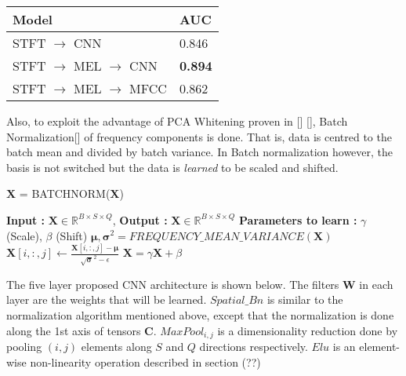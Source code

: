     \begin{tabular}{ | p{5cm} | l |}
    \hline
    \textbf{Model} & \textbf{AUC} \\ \hline
    STFT $\rightarrow$ CNN &  0.846\\ \hline
    STFT $\rightarrow$ MEL $\rightarrow$ CNN &  \textbf{0.894}\\ \hline
    STFT $\rightarrow$ MEL $\rightarrow$ MFCC &  0.862 \\ \hline
    \hline
    \end{tabular}
    
Also, to exploit the advantage of PCA Whitening proven in [] [], Batch Normalization[] of frequency components is done. That is, data is centred to the batch mean and divided by batch variance. In Batch normalization however, the basis is not switched but the data is \textit{learned} to be scaled and shifted.
\begin{algorithm}
  \caption{$\textbf{\^{X}}$ = BATCHNORM($\textbf{X}$) }\label{Batch norm}
  \begin{algorithmic}[1]
    \Statex \textbf{Input :} $\textbf{X} \in \mathbb{R}^{B \times S \times Q}$, 
    \Statex \textbf{Output :} $\textbf{\^X} \in \mathbb{R}^{B \times S \times Q}$ 
    \Statex \textbf{Parameters to learn :} $\gamma$ (Scale), $\beta$ (Shift) 
    \State $\bm{\mu}, \bm{\sigma}^{2} = FREQUENCY\_MEAN\_VARIANCE(\textbf{X})$ 
       \State $\textbf{X}[i,:,j] \leftarrow \frac{\textbf{X}[i,:,j] - \bm{\mu}}{\sqrt{\bm{\sigma}}^{2} - \epsilon}$
      \EndFor
     \EndFor
     \State $\textbf{\^X} = \gamma\textbf{X} + \beta$
  \end{algorithmic}
\end{algorithm}
\FloatBarrier

\noindent The five layer proposed CNN architecture is shown below. The filters $\textbf{W}$ in each layer are the weights that will be learned. $Spatial\_Bn$ is similar to the normalization algorithm mentioned above, except that the normalization is done along the 1st axis of tensors $\textbf{C}$. $MaxPool_{i,j}$ is a dimensionality reduction done by pooling $(i,j)$ elements along $S$ and $Q$ directions respectively. $Elu$ is an element-wise non-linearity operation described in section (??) 

